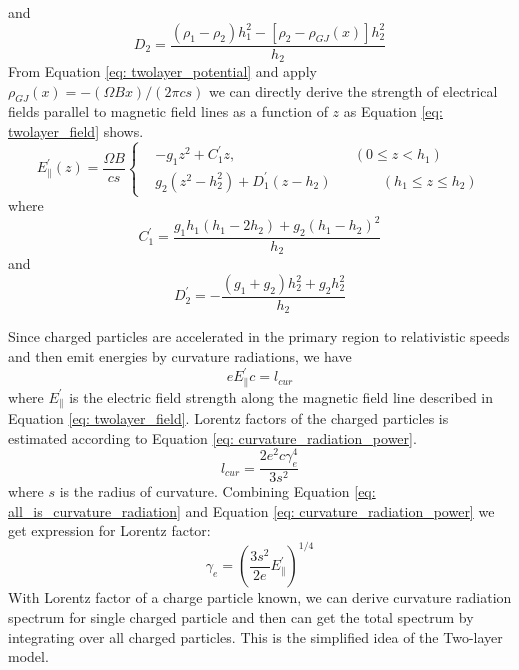 \documentclass[12pt]{report}
\begin{document}
      and 
      \begin{equation*}
        D_{2} = \frac{\left(\rho_1-\rho_2\right)h_1^2-\left[\rho_2-\rho_{GJ}\left(x\right)\right]h_2^2}{h_2}
      \end{equation*}
      From Equation \ref{eq: twolayer_potential} and apply 
      $\rho_{GJ}\left(x\right)=-\left(\Omega B x\right)/\left(2\pi cs\right)$ 
      we can directly derive the strength of electrical fields parallel to magnetic field lines as a 
      function of $z$ as Equation \ref{eq: twolayer_field} shows.
      \begin{equation}
        \label{eq: twolayer_field}
          E^{\prime}_{\parallel}\left(z\right) = \frac{\Omega B}{cs}
          \left\{\begin{alignedat}{2}
             & -g_1 z^2 + C_1^{\prime}z ,  &&\left(0 \leq z < h_{1}\right) \\
             & g_2\left(z^2 - h_2^2\right) + D_1^{\prime}\left(z-h_2\right)  &&\qquad \left(h_{1} \leq z \leq h_{2}\right) 
          \end{alignedat}\right.
      \end{equation}
      where 
      \begin{equation*}
        C_{1}^{\prime} = \frac{g_1 h_1 \left(h_1 - 2h_2\right)+ g_2\left(h_1-h_2\right)^2}{h_2}  
      \end{equation*}
      and 
      \begin{equation*}
        D_{2}^{\prime} = -\frac{\left(g_1 + g_2\right)h_2^2 + g_2 h_2^2}{h_2}
      \end{equation*}

      Since charged particles are accelerated in the primary region to relativistic speeds 
      and then emit energies by curvature radiations, we have
      \begin{equation}
        \label{eq: all_is_curvature_radiation}
        e E_{\parallel}^{\prime} c = l_{cur}
      \end{equation}
      where $E_\parallel^{\prime}$ is the electric field strength along the magnetic field 
      line described in Equation \ref{eq: twolayer_field}.
      Lorentz factors of the charged particles is estimated according to Equation 
      \ref{eq: curvature_radiation_power}.
      \begin{equation}
        \label{eq: curvature_radiation_power}
        l_{cur} = \frac{2 e^2 c \gamma^{4}_{e}}{3s^2}
      \end{equation}      
      where $s$ is the radius of curvature. 
      Combining Equation \ref{eq: all_is_curvature_radiation} and Equation
      \ref{eq: curvature_radiation_power} we get expression for Lorentz factor: 
      \begin{equation}
        \label{eq: gamma_can_be_zero}
        \gamma_{e} = \left(\frac{3s^2}{2e} E_{\parallel}^{\prime}\right)^{1/4}
      \end{equation}
      With Lorentz factor of a charge particle known, we can derive curvature radiation 
      spectrum for single charged particle and then can get the total spectrum by integrating 
      over all charged particles. This is the simplified idea of the Two-layer model. 
      
\end{document}
